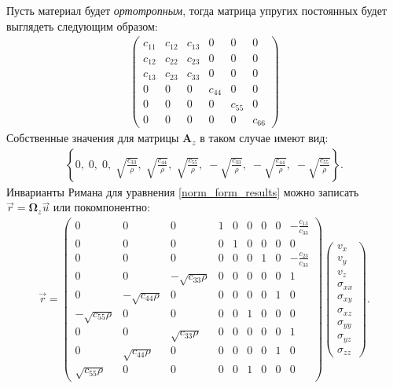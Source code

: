 	Пусть материал будет \textit{ортотропным}, тогда матрица упругих постоянных будет выглядеть следующим образом:
\begin{align}
\label{orthorombic_tensor}
\left( \begin{array}{cccccccccccc}
c_{11} & c_{12} & c_{13} & 0 & 0 & 0 \\ 
c_{12} & c_{22} & c_{23} & 0 & 0 & 0 \\ 
c_{13} & c_{23} & c_{33} & 0 & 0 & 0 \\ 
0 & 0 & 0 & c_{44} & 0 & 0 \\ 
0 & 0 & 0 & 0 & c_{55} & 0 \\ 
0 & 0 & 0 & 0 & 0 & c_{66}
\end{array} \right){}
\end{align}	
	Собственные значения для матрицы $\mathbf{A}_z$ в таком случае имеют вид:	
\begin{align}
	\left\{0,\;0,\;0,\;\sqrt{\frac{c_{33}}{\rho}},\;\sqrt{\frac{c_{44}}{\rho}},\;\sqrt{\frac{c_{55}}{\rho}},\;-\sqrt{\frac{c_{33}}{\rho}},\;-\sqrt{\frac{c_{44}}{\rho}},\;-\sqrt{\frac{c_{55}}{\rho}}\right\}.
\end{align}
	Инварианты Римана для уравнения \eqref{norm_form_results} можно записать $\vec{r} = \mathbf{\Omega}_z\vec{u}$ или покомпонентно:
\begin{align}
\label{Z_invariants}
\vec{r} =
\left( \begin{array}{cccccccccccc}
0 & 0 & 0 & 1 & 0 & 0 & 0 & 0 & -\frac{c_{13}}{c_{33}} \\ 
0 & 0 & 0 & 0 & 1 & 0 & 0 & 0 & 0 \\ 
0 & 0 & 0 & 0 & 0 & 0 & 1 & 0 & -\frac{c_{23}}{c_{33}} \\ 
0 & 0 & -\sqrt{c_{33}\rho} & 0 & 0 & 0 & 0 & 0 & 1 \\ 
0 & -\sqrt{c_{44}\rho} & 0 & 0 & 0 & 0 & 0 & 1 & 0 \\
-\sqrt{c_{55}\rho} & 0 & 0 & 0 & 0 & 1 & 0 & 0 & 0 \\
0 & 0 & \sqrt{c_{33}\rho} & 0 & 0 & 0 & 0 & 0 & 1 \\ 
0 & \sqrt{c_{44}\rho} & 0 & 0 & 0 & 0 & 0 & 1 & 0 \\
\sqrt{c_{55}\rho} & 0 & 0 & 0 & 0 & 1 & 0 & 0 & 0
\end{array} \right)
\left( \begin{array}{cccccccccccc}
v_x \\
v_y \\
v_z \\
\sigma_{xx} \\
\sigma_{xy} \\
\sigma_{xz} \\
\sigma_{yy} \\
\sigma_{yz} \\
\sigma_{zz}
\end{array} \right).
\end{align}
	
